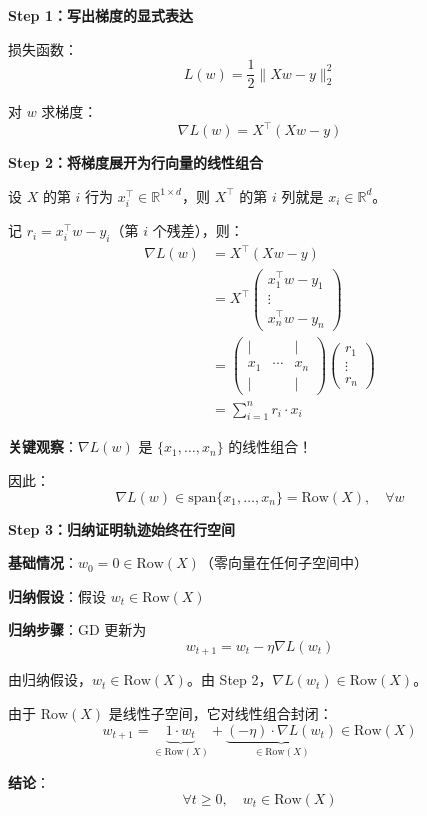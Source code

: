 \documentclass[12pt, a4paper]{ctexart}
\begin{document}
\begin{blackboard}

\textbf{Step 1：写出梯度的显式表达}

损失函数：
\[
L(w) = \frac{1}{2}\|Xw - y\|_2^2
\]

对 $w$ 求梯度：
\[
\nabla L(w) = X^\top (Xw - y)
\]

\textbf{Step 2：将梯度展开为行向量的线性组合}

设 $X$ 的第 $i$ 行为 $x_i^\top \in \mathbb{R}^{1 \times d}$，则 $X^\top$ 的第 $i$ 列就是 $x_i \in \mathbb{R}^d$。

记 $r_i = x_i^\top w - y_i$（第 $i$ 个残差），则：
\begin{align*}
\nabla L(w) &= X^\top (Xw - y) \\
&= X^\top \begin{pmatrix} x_1^\top w - y_1 \\ \vdots \\ x_n^\top w - y_n \end{pmatrix} \\
&= \begin{pmatrix} | & & | \\ x_1 & \cdots & x_n \\ | & & | \end{pmatrix} \begin{pmatrix} r_1 \\ \vdots \\ r_n \end{pmatrix} \\
&= \sum_{i=1}^{n} r_i \cdot x_i
\end{align*}

\textbf{关键观察}：$\nabla L(w)$ 是 $\{x_1, \ldots, x_n\}$ 的线性组合！

因此：
\[
\boxed{\nabla L(w) \in \text{span}\{x_1, \ldots, x_n\} = \text{Row}(X), \quad \forall w}
\]

\textbf{Step 3：归纳证明轨迹始终在行空间}

\textbf{基础情况}：$w_0 = 0 \in \text{Row}(X)$（零向量在任何子空间中）

\textbf{归纳假设}：假设 $w_t \in \text{Row}(X)$

\textbf{归纳步骤}：GD 更新为
\[
w_{t+1} = w_t - \eta \nabla L(w_t)
\]

由归纳假设，$w_t \in \text{Row}(X)$。由 Step 2，$\nabla L(w_t) \in \text{Row}(X)$。

由于 $\text{Row}(X)$ 是线性子空间，它对线性组合封闭：
\[
w_{t+1} = \underbrace{1 \cdot w_t}_{\in \text{Row}(X)} + \underbrace{(-\eta) \cdot \nabla L(w_t)}_{\in \text{Row}(X)} \in \text{Row}(X)
\]

\textbf{结论}：
\[
\boxed{\forall t \geq 0, \quad w_t \in \text{Row}(X)}
\]

\end{blackboard}
\end{document}

